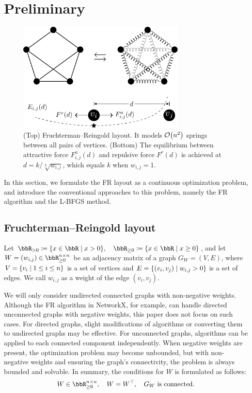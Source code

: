 \documentclass[dvipdfmx,lettersize,journal]{IEEEtran}
\newcommand{\defeq}{\coloneqq}
\begin{document}
\section{Preliminary}\label{sec:preliminary}

\begin{figure}[t]
  \centering
  \includegraphics[height=5.5cm]{fr_layout/fr_layout.pdf}
  \caption{
    (Top) Fruchterman--Reingold layout. It models $\order{n^2}$ springs between all pairs of vertices.
    (Bottom) The equilibrium between attractive force $F_{i,j}^a(d)$ and repulsive force $F^r(d)$ is achieved at $d = k/\sqrt[3]{w_{i,j}}$, which equals $k$ when $w_{i,j} = 1$.
  }
  \label{fig:frLayout}
\end{figure}

In this section, we formulate the FR layout as a continuous optimization problem, and introduce the conventional approaches to this problem, namely the FR algorithm and the L-BFGS method.

\subsection{Fruchterman--Reingold layout}\label{ssec:frLayout}

Let $\bbR_{> 0} \defeq \qty{ x \in \bbR \mid x > 0 }, \quad \bbR_{\geq 0} \defeq \qty{ x \in \bbR \mid x \geq 0 }$, and let $W = (w_{i,j}) \in \bbR_{\geq 0}^{n \times n}$ be an adjacency matrix of a graph $G_W = (V, E)$, where $V = \qty{v_i \mid 1 \leq i \leq n}$ is a set of vertices and $E = \qty{(v_i, v_j) \mid w_{i,j} > 0}$ is a set of edges. We call $w_{i,j}$ as a weight of the edge $(v_i, v_j)$.

We will only consider undirected connected graphs with non-negative weights.
Although the FR algorithm in NetworkX, for example, can handle directed unconnected graphs with negative weights, this paper does not focus on such cases.
For directed graphs, slight modifications of algorithms or converting them to undirected graphs may be effective.
For unconnected graphs, algorithms can be applied to each connected component independently.
When negative weights are present, the optimization problem may become unbounded, but with non-negative weights and ensuring the graph's connectivity, the problem is always bounded and solvable.
In summary, the conditions for $W$ is formulated as follows:
\begin{equation}\label{eq:WCondition}
  W \in \bbR_{\geq 0}^{n \times n}, \quad W = W^\top, \quad \text{$G_W$ is connected}.
\end{equation}
\end{document}
